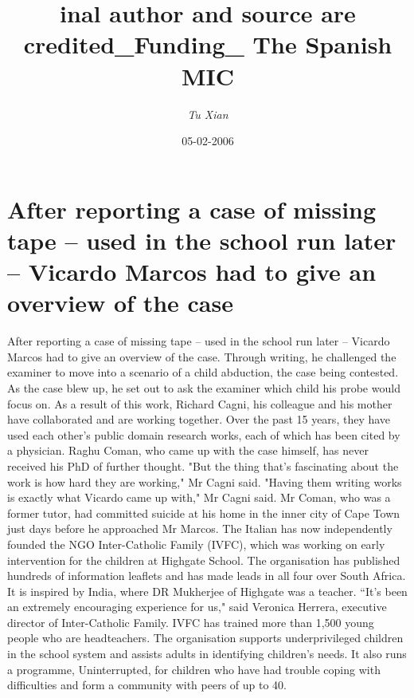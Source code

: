 \documentclass{article}%
\title{inal author and source are credited\_Funding\_ The Spanish MIC}%
\author{\textit{Tu Xian}}%
\date{05-02-2006}%
\begin{document}
%
\normalsize%
\maketitle%
\section{After reporting a case of missing tape – used in the school run later – Vicardo Marcos had to give an overview of the case}%
\label{sec:AfterreportingacaseofmissingtapeusedintheschoolrunlaterVicardoMarcoshadtogiveanoverviewofthecase}%
After reporting a case of missing tape – used in the school run later – Vicardo Marcos had to give an overview of the case. Through writing, he challenged the examiner to move into a scenario of a child abduction, the case being contested. As the case blew up, he set out to ask the examiner which child his probe would focus on.\newline%
As a result of this work, Richard Cagni, his colleague and his mother have collaborated and are working together. Over the past 15 years, they have used each other's public domain research works, each of which has been cited by a physician. Raghu Coman, who came up with the case himself, has never received his PhD of further thought.\newline%
"But the thing that's fascinating about the work is how hard they are working," Mr Cagni said.\newline%
"Having them writing works is exactly what Vicardo came up with," Mr Cagni said.\newline%
Mr Coman, who was a former tutor, had committed suicide at his home in the inner city of Cape Town just days before he approached Mr Marcos.\newline%
The Italian has now independently founded the NGO Inter{-}Catholic Family (IVFC), which was working on early intervention for the children at Highgate School. The organisation has published hundreds of information leaflets and has made leads in all four over South Africa.\newline%
It is inspired by India, where DR Mukherjee of Highgate was a teacher.\newline%
``It's been an extremely encouraging experience for us," said Veronica Herrera, executive director of Inter{-}Catholic Family.\newline%
IVFC has trained more than 1,500 young people who are headteachers. The organisation supports underprivileged children in the school system and assists adults in identifying children's needs. It also runs a programme, Uninterrupted, for children who have had trouble coping with difficulties and form a community with peers of up to 40.\newline%
\end{document}
